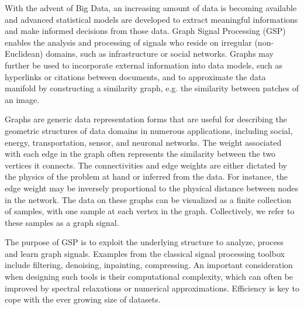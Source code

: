 \documentclass[a4paper]{scrartcl}
\begin{document}
With the advent of Big Data, an increasing amount of data is becoming available
and advanced statistical models are developed to extract meaningful informations
and make informed decisions from those data. Graph Signal Processing (GSP)
enables the analysis and processing of signals who reside on irregular
(non-Euclidean) domains, such as infrastructure or social networks. Graphs may
further be used to incorporate external information into data models, such as
hyperlinks or citations between documents, and to approximate the data manifold
by constructing a similarity graph, e.g. the similarity between patches of an
image.

Graphs are generic data representation forms that are useful for describing the
geometric structures of data domains in numerous applications, including social,
energy, transportation, sensor, and neuronal networks.
The weight associated with each edge in the graph often represents the
similarity between the two vertices it connects. The connectivities and edge
weights are either dictated by the physics of the problem at hand or inferred
from the data. For instance, the edge weight may be inversely proportional to
the physical distance between nodes in the network.
The data on these graphs can be visualized as a finite collection of samples,
with one sample at each vertex in the graph. Collectively, we refer to these
samples as a graph signal. 

The purpose of GSP is to exploit the underlying structure to analyze, process
and learn graph signals. Examples from the classical signal processing toolbox
include filtering, denoising, inpainting, compressing. An important
consideration when designing such tools is their computational complexity, which
can often be improved by spectral relaxations or numerical approximations.
Efficiency is key to cope with the ever growing size of datasets.
\end{document}
